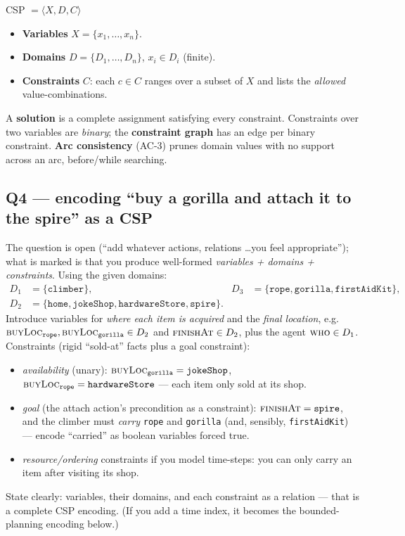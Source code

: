\documentclass[11pt,a4paper]{article}
\newcommand{\pred}[1]{\textsc{#1}}
\begin{document}
\begin{defbox}{CSP $=\langle X, D, C\rangle$}
\begin{itemize}[leftmargin=*,itemsep=1pt]
  \item \textbf{Variables} $X=\{x_1,\dots,x_n\}$.
  \item \textbf{Domains} $D=\{D_1,\dots,D_n\}$, $x_i\in D_i$ (finite).
  \item \textbf{Constraints} $C$: each $c\in C$ ranges over a subset of $X$ and lists the \emph{allowed} value-combinations.
\end{itemize}
A \textbf{solution} is a complete assignment satisfying every constraint. Constraints over two variables are \emph{binary}; the \textbf{constraint graph} has an edge per binary constraint. \textbf{Arc consistency} (AC-3) prunes domain values with no support across an arc, before/while searching.
\end{defbox}

\subsection*{Q4 --- encoding ``buy a gorilla and attach it to the spire'' as a CSP}

The question is open (``add whatever actions, relations \dots you feel appropriate''); what is marked is that you produce well-formed \emph{variables + domains + constraints}. Using the given domains:
\[
\begin{aligned}
D_1&=\{\texttt{climber}\}, &
D_3&=\{\texttt{rope},\texttt{gorilla},\texttt{firstAidKit}\},\\
D_2&=\{\texttt{home},\texttt{jokeShop},\texttt{hardwareStore},\texttt{spire}\}.
\end{aligned}
\]
Introduce variables for \emph{where each item is acquired} and the \emph{final location}, e.g.\ $\pred{buyLoc}_{\texttt{rope}},\pred{buyLoc}_{\texttt{gorilla}}\in D_2$ and $\pred{finishAt}\in D_2$, plus the agent $\pred{who}\in D_1$. Constraints (rigid ``sold-at'' facts plus a goal constraint):
\begin{itemize}[leftmargin=*,itemsep=1pt]
  \item \emph{availability} (unary): $\pred{buyLoc}_{\texttt{gorilla}}=\texttt{jokeShop}$, $\pred{buyLoc}_{\texttt{rope}}=\texttt{hardwareStore}$ --- each item only sold at its shop.
  \item \emph{goal} (the attach action's precondition as a constraint): $\pred{finishAt}=\texttt{spire}$, and the climber must \emph{carry} \texttt{rope} and \texttt{gorilla} (and, sensibly, \texttt{firstAidKit}) --- encode ``carried'' as boolean variables forced true.
  \item \emph{resource/ordering} constraints if you model time-steps: you can only carry an item after visiting its shop.
\end{itemize}
State clearly: variables, their domains, and each constraint as a relation --- that is a complete CSP encoding. (If you add a time index, it becomes the bounded-planning encoding below.)
\end{document}
